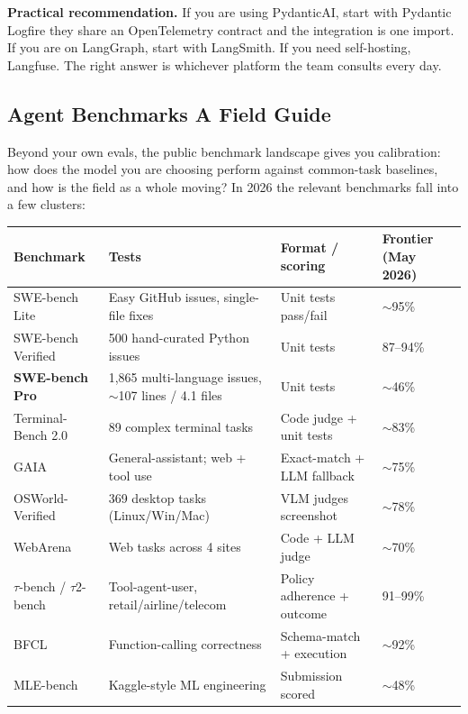 \documentclass[a4paper,11pt]{article}
\begin{document}
\begin{ambercallout}
\textbf{Practical recommendation.}
If you are using PydanticAI, start with Pydantic Logfire \textemdash{}
they share an OpenTelemetry contract and the integration is one
import. If you are on LangGraph, start with LangSmith. If you need
self-hosting, Langfuse. The right answer is whichever platform the
team consults every day.
\end{ambercallout}

\subsection{Agent Benchmarks \textemdash{} A Field Guide}

Beyond your own evals, the public benchmark landscape gives you
calibration: how does the model you are choosing perform against
common-task baselines, and how is the field as a whole moving? In
2026 the relevant benchmarks fall into a few clusters:

\begin{center}\small
\begin{tabular}{p{3cm} p{3.6cm} p{3.4cm} p{2.6cm}}
  \toprule
  \textbf{Benchmark} & \textbf{Tests} & \textbf{Format / scoring} & \textbf{Frontier (May 2026)} \\
  \midrule
  SWE-bench Lite & Easy GitHub issues, single-file fixes & Unit tests pass/fail & $\sim$95\% \\
  SWE-bench Verified & 500 hand-curated Python issues & Unit tests & 87–94\% \\
  \textbf{SWE-bench Pro} & 1{,}865 multi-language issues, $\sim$107 lines / 4.1 files & Unit tests & $\sim$46\% \\
  Terminal-Bench 2.0 & 89 complex terminal tasks & Code judge + unit tests & $\sim$83\% \\
  GAIA & General-assistant; web + tool use & Exact-match + LLM fallback & $\sim$75\% \\
  OSWorld-Verified & 369 desktop tasks (Linux/Win/Mac) & VLM judges screenshot & $\sim$78\% \\
  WebArena & Web tasks across 4 sites & Code + LLM judge & $\sim$70\% \\
  $\tau$-bench / $\tau$2-bench & Tool-agent-user, retail/airline/telecom & Policy adherence + outcome & 91–99\% \\
  BFCL & Function-calling correctness & Schema-match + execution & $\sim$92\% \\
  MLE-bench & Kaggle-style ML engineering & Submission scored & $\sim$48\% \\
  \bottomrule
\end{tabular}
\end{center}
\end{document}
